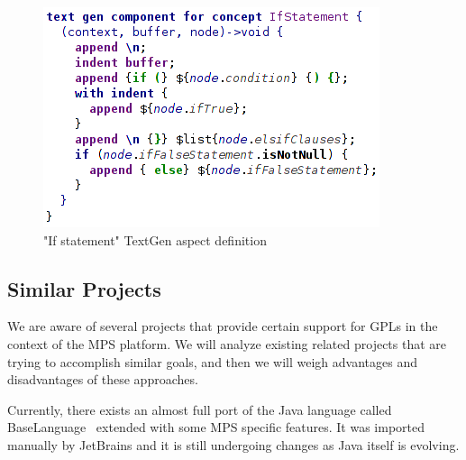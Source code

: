 \begin{figure}[ht]
	\centering
	\includegraphics[scale=0.6]{./images/if_statement_textgen.png}
	\caption{"If statement" TextGen aspect definition}
	\label{fig:if_statement_textgen}
\end{figure}


\subsection{Similar Projects}

We are aware of several projects that provide certain support for GPLs in the context of the MPS platform.
We will analyze existing related projects that are trying to accomplish similar goals, and then we will weigh advantages and disadvantages of these approaches.

Currently, there exists an almost full port of the Java language called BaseLanguage~\cite{ref:BaseLanguage} extended with some MPS specific features.
It was imported manually by JetBrains and it is still undergoing changes as Java itself is evolving.

